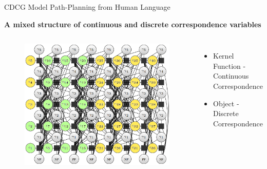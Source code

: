 
\begin{frame}{CDCG}{ Model Path-Planning from Human Language }
	
{\bf A mixed structure of continuous and discrete correspondence variables}

\begin{columns}
	\begin{figure}
		\centering
		\includegraphics[width=\linewidth]{figure/DCG_network_structure}
	\end{figure}
	\begin{itemize}
		\item Kernel Function - Continuous Correspondence
		\item Object - Discrete Correspondence
	\end{itemize}
\end{columns}

	
\end{frame}

